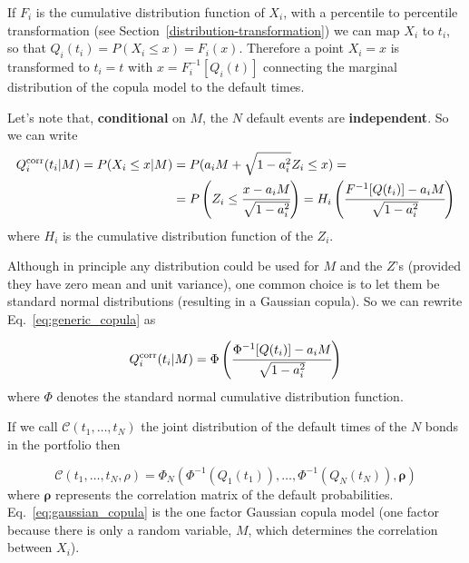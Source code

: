 If $F_i$ is the cumulative distribution function of $X_i$, with a percentile to percentile transformation (see Section~\ref{distribution-transformation}) we can map \(X_i\) to \(t_i\), so that $Q_i(t_i) = P(X_i\le x)=F_i(x)$. Therefore a point \(X_i = x\) is transformed to \(t_i = t\) with \(x = F_i^{-1}[Q_i(t)]\) connecting the marginal distribution of the copula model to the default times.

Let's note that, \textbf{conditional} on $M$, the $N$ default events are \textbf{independent}. So we can write
\begin{equation}
\begin{split}
Q_i^{\textrm{corr}}(t_i|M) = P(X_i\le x|M) &= P(a_i M + \sqrt{1-a_i^2}Z_i\le x) =\\
&= P\left(Z_i\le \cfrac{x-a_i M}{\sqrt{1-a_i^2}}\right)
=H_i\left(\cfrac{F^{-1}[Q(t_i)]-a_i M}{\sqrt{1-a_i^2}}\right)
\end{split}
\label{eq:generic_copula}
\end{equation}
where $H_i$ is the cumulative distribution function of the $Z_i$.

Although in principle any distribution could be used for \(M\) and the \(Z\)'s (provided they have zero mean and unit variance), one common choice is to let them be standard normal distributions (resulting in a Gaussian copula).
So we can rewrite Eq.~\ref{eq:generic_copula} as

\begin{equation}
Q_i^{\textrm{corr}}(t_i|M) = \Phi\left(\cfrac{\Phi^{-1}[Q(t_i)]-a_i M}{\sqrt{1-a_i^2}}\right)
\label{eq:gaussian_one_factor_copula}
\end{equation}
where $\Phi$ denotes the standard normal cumulative distribution function.

If we call $\mathcal{C}(t_1,\ldots,t_N)$ the joint distribution of the default times of the $N$ bonds in the portfolio then

\begin{equation}
\mathcal{C}(t_1,\ldots,t_N, \rho)=\Phi_{N}(\Phi^{-1}(Q_1(t_1)),\ldots,\Phi^{-1}(Q_N(t_N)), \boldsymbol{\rho})
\label{eq:gaussian_copula}
\end{equation}
where $\boldsymbol{\rho}$ represents the correlation matrix of the default probabilities. Eq.~\ref{eq:gaussian_copula} is the one factor Gaussian copula model (one factor because there is only a random variable, $M$, which determines the correlation between $X_i$).

